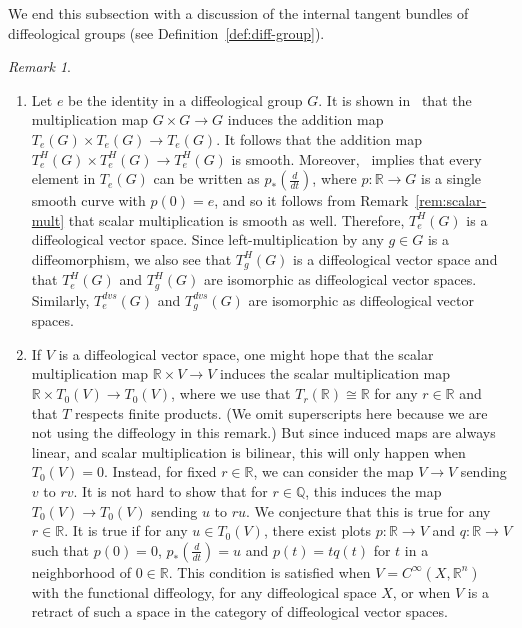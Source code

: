 \documentclass[12pt]{amsart}
\theoremstyle{remark}
\newtheorem{rem}[de]{Remark}
\newcommand{\ra}{\to}
\newcommand{\ddt}{{\textstyle\frac{d}{dt}}}
\def \Q{\mathbb{Q}}
\def \R{\mathbb{R}}
\begin{document}
We end this subsection with a discussion of the internal tangent bundles of diffeological groups
(see Definition~\ref{def:diff-group}).

\begin{rem}\label{rem:diff-group}\
\begin{enumerate}
\item Let $e$ be the identity in a diffeological group $G$.
It is shown in~\cite[Proposition~6.4]{HM} that the multiplication map $G \times G \ra G$
induces the addition map $T_e(G) \times T_e(G) \ra T_e(G)$.
It follows that the addition map
$T_e^H(G) \times T_e^H(G) \ra T_e^H(G)$ is smooth.
Moreover,~\cite[Corollary~6.5]{HM} implies that every element in $T_e(G)$
can be written as $p_*(\frac{d}{dt})$, where $p:\R \ra G$ is a single smooth curve with $p(0)=e$,
and so it follows from Remark~\ref{rem:scalar-mult} that scalar multiplication is smooth as well.
Therefore, $T_e^H(G)$ is a diffeological vector space.
Since left-multiplication by any $g \in G$ is a diffeomorphism,
we also see that $T_g^H(G)$ is a diffeological vector space
and that $T_e^H(G)$ and $T_g^H(G)$ are isomorphic as diffeological vector spaces.
Similarly, $T_e^{dvs}(G)$ and $T_g^{dvs}(G)$ are isomorphic as diffeological vector spaces.

%
\item If $V$ is a diffeological vector space, one might hope that the
scalar multiplication map $\R \times V \to V$ induces the scalar multiplication
map $\R \times T_0(V) \to T_0(V)$, where we use that $T_r(\R) \cong \R$ for any $r \in \R$
and that $T$ respects finite products.
(We omit superscripts here because we are not using the diffeology in this remark.)
%
But since induced maps are always linear, and scalar multiplication is bilinear,
this will only happen when $T_0(V) = 0$.
Instead, for fixed $r \in \R$, we can consider the map $V \to V$ sending $v$ to $r v$.
It is not hard to show that for $r \in \Q$, this induces the map $T_0(V) \to T_0(V)$
sending $u$ to $r u$.
We conjecture that this is true for any $r \in \R$.
It is true if for any $u \in T_0(V)$, there exist plots $p: \R \to V$ and 
$q: \R \to V$ such that $p(0) = 0$, $p_*(\ddt) = u$ and $p(t) = t q(t)$ for $t$ in a neighborhood of $0 \in \R$. 
This condition is satisfied when $V = C^\infty(X, \R^n)$ with the functional diffeology, for any 
diffeological space $X$, or when $V$ is a retract of such a space in the category of diffeological vector spaces.
\end{enumerate}
\end{rem}
\end{document}
